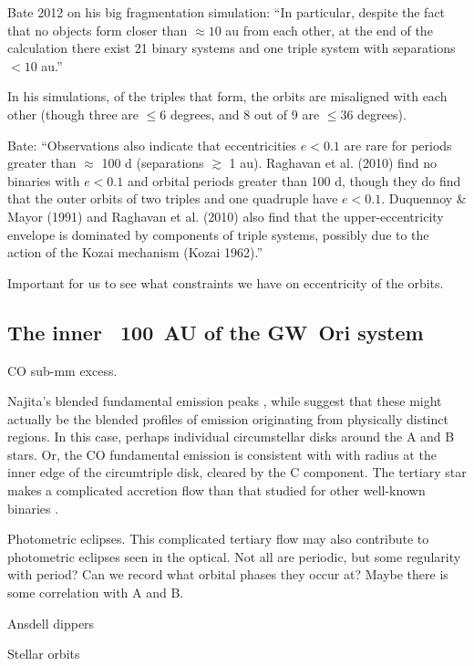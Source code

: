 \documentclass[twocolumn]{aastex61}
\begin{document}
Bate 2012 on his big fragmentation simulation: ``In particular, despite the fact that no objects form closer than $\approx 10$ au from each other, at the end of the calculation there exist 21 binary systems and one triple system with separations $<10$ au.''

In his simulations, of the triples that form, the orbits are misaligned with each other (though three are $\leq 6$ degrees, and 8 out of 9 are $\leq 36$ degrees).

Bate:  ``Observations also indicate that eccentricities $e < 0.1$ are rare for periods greater than $\approx$ 100 d (separations $\gtrsim$ 1 au). Raghavan et al. (2010) find no binaries with $e < 0.1$ and orbital periods greater than 100 d, though they do find that the outer orbits of two triples and one quadruple have $e < 0.1$. Duquennoy \& Mayor (1991) and Raghavan et al. (2010) also find that the upper-eccentricity envelope is dominated by components of triple systems, possibly due to the action of the Kozai mechanism (Kozai 1962).''

Important for us to see what constraints we have on eccentricity of the orbits.



\subsection{The inner ~100 \,AU of the GW~Ori system} \label{sec:inner disk}

CO sub-mm excess.

Najita's blended fundamental emission peaks \citep{najita03}, while \citet{bast11} suggest that these might actually be the blended profiles of emission originating from physically distinct regions. In this case, perhaps individual circumstellar disks around the A and B stars. Or, the CO fundamental emission is consistent with with radius at the inner edge of the circumtriple disk, cleared by the C component. The tertiary star makes a complicated accretion flow than that studied for other well-known binaries \citep[e.g., DQ~Tau;]{artymowicz94,mathieu97}.

Photometric eclipses. This complicated tertiary flow may also contribute to photometric eclipses seen in the optical. Not all are periodic, but some regularity with period? Can we record what orbital phases they occur at? Maybe there is some correlation with A and B.

Ansdell dippers

Stellar orbits
\end{document}
